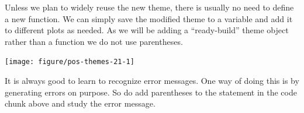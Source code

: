 \documentclass[krantz2]{krantz}\usepackage{knitr}%
\begin{document}
Unless we plan to widely reuse the new theme, there is usually no need to define a new function. We can simply save the modified theme to a variable and add it to different plots as needed. As we will be adding a ``ready-build'' theme object rather than a function we do not use parentheses.

\begin{knitrout}\footnotesize
{}\color{fgcolor}\begin{kframe}
\begin{alltt}
 \hlkwb{<-} \hlstd{()} \hlopt{+} \hlstd{(} \hlstd{=} \hlstd{(} \hlstd{=} \hlstd{))}
 \hlopt{+} 
\end{alltt}
\end{kframe}

{\centering \texttt{[image: figure/pos-themes-21-1]} 

}



\end{knitrout}

\begin{playground}
It is always good to learn to recognize error messages. One way of doing this is by generating errors on purpose. So do add parentheses to the statement in the code chunk above and study the error message.
\end{playground}
\end{document}
